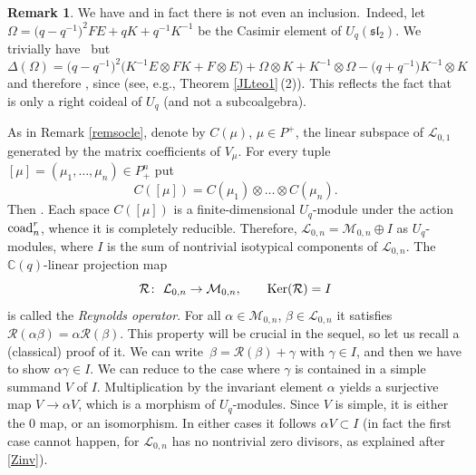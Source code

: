 \documentclass[10pt,a4paper]{amsart}
\numberwithin{equation}{section}
\theoremstyle{definition}
\newtheorem{Remark}[teo]{Remark}
\newcommand{\mc}{\mathbb{C}}
\newcommand{\Ll}{{\mathcal L}}
\newcommand{\Mm}{{\mathcal M}}
\newcommand{\Rr}{{\mathcal R}}
\newcommand{\ra}{\rightarrow}
\begin{document}
\begin{Remark}We have  and in fact there is not even an inclusion.~Indeed, let $\Omega=\big(q-q^{-1}\big)^2FE+qK+q^{-1}K^{-1}$ be the Casimir element of $U_q({\mathfrak{sl}_2})$. We trivially have~ but
\[\Delta(\Omega)=\big(q-q^{-1}\big)^2\big(K^{-1}E\otimes FK+F\otimes E\big)+
\Omega\otimes K+ K^{-1}\otimes \Omega-\big(q+q^{-1}\big)K^{-1}\otimes K\]
and therefore , since  (see, e.g., Theorem \ref{JLteo1}\,(2)). This reflects the fact that  is only a right coideal of $U_q$ (and not a subcoalgebra).
\end{Remark}
As in Remark \ref{remsocle}, denote by $C(\mu)$, $\mu\in P^+$, the linear subspace of $\Ll_{0,1}$ generated by the matrix coefficients of $V_\mu$. For every tuple $[\mu] = (\mu_1,\dots,\mu_n)\in P_+^n$ put
\begin{equation}\label{defCmu}
C([\mu]) =C(\mu_1)\otimes \dots \otimes C(\mu_n).
\end{equation}
Then . Each space $C({[\mu]})$ is a finite-dimensional $U_q$-module under the action ${\rm coad}^r_n$, whence it is completely reducible. Therefore, $
\Ll_{0,n} = \Mm_{0,n} \oplus I$ as $U_q$-modules, where $I$ is the sum of nontrivial isotypical components of $\Ll_{0,n}$. The $\mc(q)$-linear projection map
\begin{equation}\label{Reynoldsdef}
\Rr\colon\ {\mathcal L}_{0,n}\ra \Mm_{0,n}, \qquad {\rm Ker}(\Rr)=I
\end{equation}
is called the {\it Reynolds operator}. For all $\alpha\in \Mm_{0,n}$, $\beta \in \Ll_{0,n}$ it satisfies $
\Rr(\alpha \beta) = \alpha \Rr(\beta)$.
This property will be crucial in the sequel, so let us recall a (classical) proof of it. We can write~${\beta = \Rr(\beta) + \gamma}$ with $\gamma \in I$, and then we have to show $\alpha \gamma \in I$. We can reduce to the case where $\gamma$ is contained in a simple summand $V$ of $I$. Multiplication by the invariant element $\alpha$ yields a surjective map $V \ra \alpha V$, which is a morphism of $U_q$-modules. Since $V$ is simple, it is either the $0$ map, or an isomorphism. In either cases it follows $\alpha V \subset I$ (in fact the first case cannot happen, for $\Ll_{0,n}$ has no nontrivial zero divisors, as explained after \eqref{Zinv}).
\end{document}
